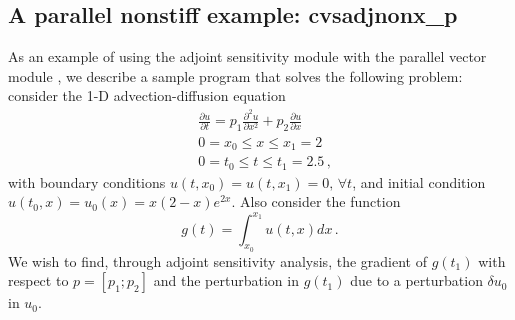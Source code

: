 
\newpage
\subsection{A parallel nonstiff example: cvsadjnonx\_p}
\label{ss:cvsadjnonx_p}

As an example of using the {\cvodes} adjoint sensitivity module with
the parallel vector module {\nvecp}, we describe a sample program
that solves the following problem: consider the 1-D advection-diffusion
equation
\begin{equation}\label{e:cvsadjnonx_p:orig_pde}
  \begin{split}
    & \frac{\partial u}{\partial t} = p_1 \frac{\partial^2 u}{\partial x^2} 
    + p_2 \frac{\partial u}{\partial x} \\
    & 0 = x_0 \le x \le x_1 = 2 \\
    & 0 = t_0 \le t \le t_1 = 2.5 \, ,
  \end{split}
\end{equation}
with boundary conditions $u(t,x_0) = u(t,x_1) = 0 ,\, \forall t$,
and initial condition $u(t_0 , x) = u_0(x) = x(2-x)e^{2x}$. Also
consider the function
\begin{equation*}
  g(t) = \int_{x_0}^{x_1} u(t,x) dx \, .
\end{equation*}
We wish to find, through adjoint sensitivity analysis, the gradient of
$g(t_1)$ with respect to $p = [p_1 ; p_2]$ and the perturbation in $g(t_1)$
due to a perturbation $\delta u_0$ in $u_0$.


